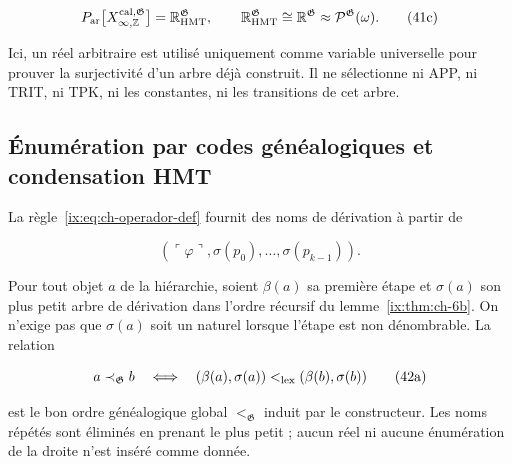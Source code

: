 \[
 P_{\rm ar}
 \bigl[X_{\infty,\mathbb Z}^{\rm cal,\mathfrak G}\bigr]
 =\mathbb R_{\rm HMT}^{\mathfrak G},
 \qquad
 \mathbb R_{\rm HMT}^{\mathfrak G}
 \cong\mathbb R^{\mathfrak G}
 \approx\mathcal P^{\mathfrak G}(\omega).
\tag{41c}\label{ix:eq:ch-recta-potencia}
\]

Ici, un réel arbitraire est utilisé uniquement comme variable universelle pour prouver
la surjectivité d’un arbre déjà construit. Il ne sélectionne ni APP, ni TRIT, ni TPK, ni les
constantes, ni les transitions de cet arbre.

\subsection{Énumération par codes généalogiques et condensation HMT}

La règle~\eqref{ix:eq:ch-operador-def} fournit des noms de dérivation à partir de

\[
 (\ulcorner\varphi\urcorner,
  \sigma(p_0),\ldots,\sigma(p_{k-1})).
\tag{42}\label{ix:eq:ch-codigo-nombres}
\]

Pour tout objet \(a\) de la hiérarchie, soient \(\beta(a)\) sa première
étape et \(\sigma(a)\) son plus petit arbre de dérivation dans l’ordre récursif du
lemme~\ref{ix:thm:ch-6b}. On n’exige pas que \(\sigma(a)\) soit un naturel lorsque l’étape est non
dénombrable. La relation

\[
 a\prec_{\mathfrak G}b
 \quad\Longleftrightarrow\quad
 (\beta(a),\sigma(a))<_{\rm lex}
 (\beta(b),\sigma(b))
\tag{42a}\label{ix:eq:ch-orden-genealogico}
\]

est le bon ordre généalogique global \(<_{\mathfrak G}\) induit par le
constructeur. Les noms répétés sont éliminés en prenant le plus petit ; aucun réel
ni aucune énumération de la droite n’est inséré comme donnée.

